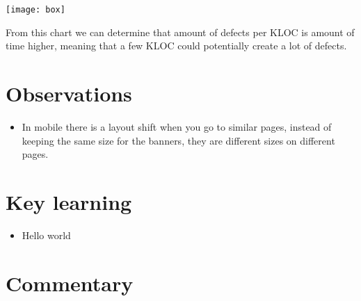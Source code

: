 \begin{center}
    \texttt{[image: box]}    
\end{center}
\noindent
From this chart we can determine that amount of defects per KLOC is amount of time higher, meaning that a few KLOC could potentially create a lot of defects.

\pagebreak

\section{Observations}
\begin{itemize}
    \item In mobile there is a layout shift when you go to similar pages, instead of keeping the same size for the banners, they are different sizes on different pages.
\end{itemize}
\pagebreak

\section{Key learning}
\begin{itemize}
    \item Hello world
\end{itemize}

\pagebreak

\section{Commentary}
